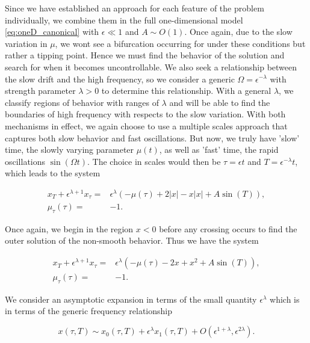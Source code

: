 Since we have established an approach for each feature of the problem individually, we combine them in the full one-dimensional model \eqref{eq:oneD_canonical} with $\epsilon\ll 1$ and ${A\sim O(1)}$. Once again, due to the slow variation in $\mu$, we wont see a bifurcation occurring for under these conditions but rather a tipping point. Hence we must find the behavior of the solution and search for when it becomes uncontrollable. We also seek a relationship between the slow drift and the high frequency, so we consider a generic $\Omega = \epsilon^{-\lambda}$ with strength parameter $\lambda>0$ to determine this relationship. With a general $\lambda$, we  classify regions of behavior with ranges of $\lambda$ and will be able to find the boundaries of high frequency with respects to the slow variation. With both mechanisms in effect, we again choose to use a multiple scales approach that captures both slow behavior and fast oscillations. But now, we truly have 'slow' time, the slowly varying parameter $\mu(t)$, as well as 'fast' time, the rapid oscillations $\sin(\Omega t)$. The choice in scales would then be $\tau=\epsilon t$ and $T=\epsilon^{-\lambda} t$, which leads to the system

\begin{equation*}
\begin{aligned}
x_T+\epsilon^{\lambda+1}x_\tau =& \epsilon^\lambda (-\mu(\tau)+2|x|-x|x|+A\sin(T)),\\
\mu_\tau(\tau)=&-1.
\end{aligned}
\end{equation*}

Once again, we begin in the region $x<0$ before any crossing occurs to find the outer solution of the non-smooth behavior. Thus we have the system

\begin{equation}\label{eq:oneD_slowosc_outereq}
\begin{aligned}
x_T+\epsilon^{\lambda+1}x_\tau =& \epsilon^\lambda (-\mu(\tau)-2x+x^2+A\sin(T)),\\
\mu_\tau(\tau)=&-1.
\end{aligned}
\end{equation}

We consider an asymptotic expansion in terms of the small quantity $\epsilon^\lambda$ which is in terms of the generic frequency relationship 

\begin{equation}\label{eq:oneD_slowosc_asympexpansion}
x(\tau,T)\sim x_0(\tau,T)+\epsilon^\lambda x_1(\tau,T)+O(\epsilon^{1+\lambda},\epsilon^{2\lambda}).
\end{equation}

